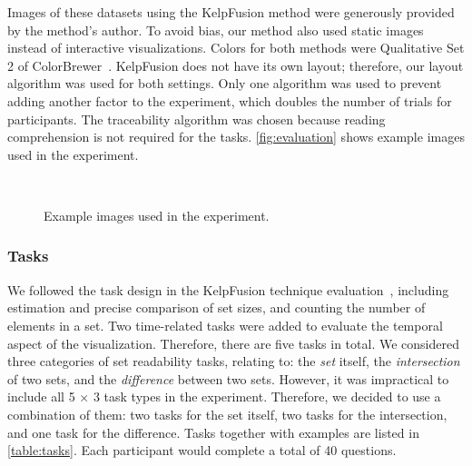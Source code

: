 
Images of these datasets using the KelpFusion method were generously provided by the method's author. To avoid bias, our method also used static images instead of interactive visualizations. Colors for both methods were Qualitative Set 2 of ColorBrewer~\cite{Harrower2003}. KelpFusion does not have its own layout; therefore, our layout algorithm was used for both settings. Only one algorithm was used to prevent adding another factor to the experiment, which doubles the number of trials for participants. The traceability algorithm was chosen because reading comprehension is not required for the tasks. \autoref{fig:evaluation} shows example images used in the experiment.

\begin{figure}[!htb]
	\centering
	\\
	\caption{Example images used in the experiment.}
	\label{fig:evaluation}
\end{figure}

\subsubsection{Tasks} We followed the task design in the KelpFusion technique evaluation~\cite{Meulemans2013}, including estimation and precise comparison of set sizes, and counting the number of elements in a set. Two time-related tasks were added to evaluate the temporal aspect of the  visualization. Therefore, there are five tasks in total. We considered three categories of set readability tasks, relating to: the \textit{set} itself, the \textit{intersection} of two sets, and the \textit{difference} between two sets. However, it was impractical to include all 5 $\times$ 3 task types in the experiment. Therefore, we decided to use a combination of them: two tasks for the set itself, two tasks for the intersection, and one task for the difference. Tasks together with examples are listed in \autoref{table:tasks}. Each participant would complete a total of 40 questions.

